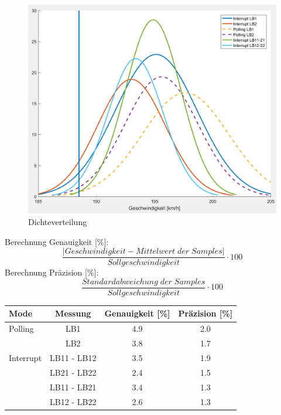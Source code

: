 \begin{figure}[ht]
    \centering
    \includegraphics[width=\textwidth]{images/densi.png}
    \caption{Dichteverteilung}
    \label{fig:density}
\end{figure}
Berechnung Genauigkeit [\%]:
\[ \frac{|Geschwindigkeit - Mittelwert\;der \; Samples|}{Sollgeschwindigkeit}\cdot 100 \]
%
Berechnung Präzision  [\%]:
\[ \frac{Standardabweichung\;der \; Samples}{Sollgeschwindigkeit}\cdot 100 \]
\begin{center}
\begin{tabular}{lccc}
	\textbf{Mode} & \textbf{Messung} & \textbf{Genauigkeit [\%]} & \textbf{Präzision [\%]} \\ \hline
	Polling       &       LB1        & 4.9                     &  2.0                    \\
	              &       LB2        & 3.8                     &  1.7                    \\
	Interrupt     &   LB11 - LB12    & 3.5                     &  1.9                    \\
	              &   LB21 - LB22    & 2.4                     &  1.5                    \\
	              &   LB11 - LB21    & 3.4                     &  1.3                    \\
	              &   LB12 - LB22    & 2.6                     &  1.3
\end{tabular}
\end{center}


